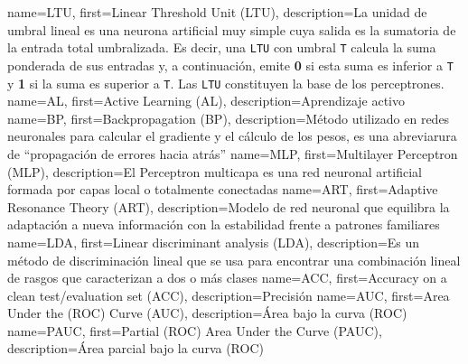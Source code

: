       {name={LTU},        first={Linear Threshold Unit (LTU)},                    description={La unidad de umbral lineal es una neurona artificial muy simple cuya salida es la sumatoria de la entrada total umbralizada. Es decir, una \texttt{LTU} con umbral \texttt{T} calcula la suma ponderada de sus entradas y, a continuación, emite \textbf{0} si esta suma es inferior a \texttt{T} y \textbf{1} si la suma es superior a \texttt{T}. Las \texttt{LTU} constituyen la base de los perceptrones. \cite{mldict}}}
       {name={AL},         first={Active Learning (AL)},                           description={Aprendizaje activo}}
    {name={BP},         first={Backpropagation (BP)},                           description={Método utilizado en redes neuronales para calcular el gradiente y el cálculo de los pesos, es una abreviarura de ``propagación de errores hacia atrás''}}
      {name={MLP},        first={Multilayer Perceptron (MLP)},                    description={El Perceptron multicapa es una red neuronal artificial formada por capas local o totalmente conectadas}}
   {name={ART},        first={Adaptive Resonance Theory (ART)},                description={Modelo de red neuronal que equilibra la adaptación a nueva información con la estabilidad frente a patrones familiares}}
      {name={LDA},        first={Linear discriminant analysis (LDA)},             description={Es un método de discriminación lineal que se usa para encontrar una combinación lineal de rasgos que caracterizan a dos o más clases}}
      {name={ACC},        first={Accuracy on a clean test/evaluation set (ACC)},  description={Precisión}}
      {name={AUC},        first={Area Under the (ROC) Curve (AUC)},               description={Área bajo la curva (ROC)}}
     {name={PAUC},       first={Partial (ROC) Area Under the Curve (PAUC)},      description={Área parcial bajo la curva (ROC)}}


